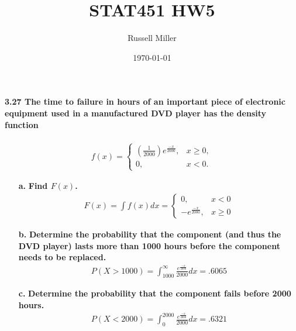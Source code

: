 \documentclass{article}
\title{STAT451 HW5}
\author{Russell Miller}
\date{\today}
\begin{document}
\maketitle


\paragraph{3.27 The time to failure in hours of an important piece of electronic 
equipment used in a manufactured DVD player has the density function}
\begin{eqnarray*}
f(x) = \left\{ \begin{array}{ll}
	\left(\frac{1}{2000}\right)e^{\frac{-x}{2000}}, & x\geq 0,\\
	0, & x<0.
	\end{array} \right.
\end{eqnarray*}
\begin{enumerate}
\item[\textbf{a.}] \textbf{Find $F(x)$.}
\begin{eqnarray*}
F(x) = \int f(x)dx = \left\{ \begin{array}{ll}
	0, & x<0\\
	-e^{\frac{-x}{2000}}, & x \geq 0
	\end{array} \right.
\end{eqnarray*}

\item[\textbf{b.}] \textbf{Determine the probability that the component (and 
thus the DVD player) lasts more than 1000 hours before the component needs to 
be replaced.}
\begin{eqnarray*}
P(X>1000) = \int_{1000}^\infty \frac{e^{\frac{-x}{2000}}}{2000}dx = .6065
\end{eqnarray*}

\item[\textbf{c.}] \textbf{Determine the probability that the component fails
before 2000 hours.}
\begin{eqnarray*}
P(X<2000) = \int_0^{2000} \frac{e^{\frac{-x}{2000}}}{2000}dx = .6321
\end{eqnarray*}
\end{enumerate}
\end{document}
